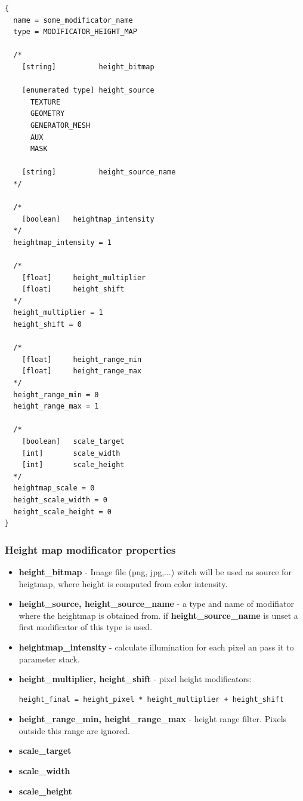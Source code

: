 \documentclass[9pt]{article}
\begin{document}
\begin{verbatim}
{
  name = some_modificator_name
  type = MODIFICATOR_HEIGHT_MAP
  
  /*
    [string]          height_bitmap
    
    [enumerated type] height_source
      TEXTURE
      GEOMETRY
      GENERATOR_MESH
      AUX
      MASK
    
    [string]          height_source_name
  */
  
  /*
    [boolean]   heightmap_intensity
  */
  heightmap_intensity = 1
  
  /*    
    [float]     height_multiplier
    [float]     height_shift
  */
  height_multiplier = 1
  height_shift = 0
  
  /*
    [float]     height_range_min
    [float]     height_range_max
  */  
  height_range_min = 0
  height_range_max = 1
  
  /*  
    [boolean]   scale_target
    [int]       scale_width
    [int]       scale_height
  */
  heightmap_scale = 0
  height_scale_width = 0
  height_scale_height = 0
}
\end{verbatim}
\subsubsection*{Height map modificator properties}
\begin{itemize}
\item{\bf height\_bitmap} - Image file (png, jpg,...) witch will be used as 
source for heigtmap, where height is computed from color intensity.
\item{\bf height\_source, height\_source\_name} - a type and name of modifiator 
where the heightmap is obtained from. if {\bf height\_source\_name} is unset a first
modificator of this type is used.
\item{\bf heightmap\_intensity} - calculate illumination for each pixel an pass it
to parameter stack.
\item{\bf height\_multiplier, height\_shift} - pixel height modificators:
\begin{verbatim}
height_final = height_pixel * height_multiplier + height_shift
\end{verbatim}
\item{\bf height\_range\_min, height\_range\_max} - height range filter. Pixels
outside this range are ignored.
\item{\bf scale\_target}
\item{\bf scale\_width}
\item{\bf scale\_height}
\end{itemize}
\end{document}
